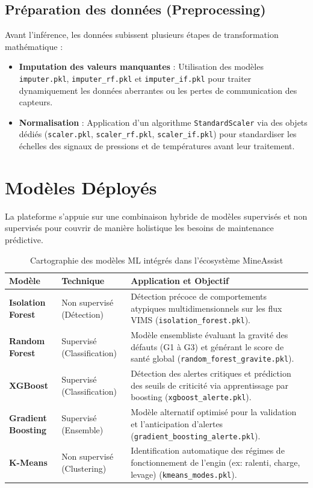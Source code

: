 \documentclass[12pt,a4paper]{report}
\begin{document}
\subsection{Préparation des données (Preprocessing)}
Avant l'inférence, les données subissent plusieurs étapes de transformation mathématique :
\begin{itemize}
  \item \textbf{Imputation des valeurs manquantes} : Utilisation des modèles \texttt{imputer.pkl}, \texttt{imputer\_rf.pkl} et \texttt{imputer\_if.pkl} pour traiter dynamiquement les données aberrantes ou les pertes de communication des capteurs.
  \item \textbf{Normalisation} : Application d'un algorithme \texttt{StandardScaler} via des objets dédiés (\texttt{scaler.pkl}, \texttt{scaler\_rf.pkl}, \texttt{scaler\_if.pkl}) pour standardiser les échelles des signaux de pressions et de températures avant leur traitement.
\end{itemize}

\section{Modèles Déployés}

La plateforme s'appuie sur une combinaison hybride de modèles supervisés et non supervisés pour couvrir de manière holistique les besoins de maintenance prédictive.

\begin{table}[H]
\centering
\begin{tabular}{>{\bfseries}p{3cm} p{4cm} p{7cm}}
\toprule
\textcolor{ocpGreen}{Modèle} & \textcolor{ocpGreen}{Technique} & \textcolor{ocpGreen}{Application et Objectif} \\
\midrule
Isolation Forest & Non supervisé (Détection) & Détection précoce de comportements atypiques multidimensionnels sur les flux VIMS (\texttt{isolation\_forest.pkl}). \\
\addlinespace
Random Forest & Supervisé (Classification) & Modèle ensembliste évaluant la gravité des défauts (G1 à G3) et générant le score de santé global (\texttt{random\_forest\_gravite.pkl}). \\
\addlinespace
XGBoost & Supervisé (Classification) & Détection des alertes critiques et prédiction des seuils de criticité via apprentissage par boosting (\texttt{xgboost\_alerte.pkl}). \\
\addlinespace
Gradient Boosting & Supervisé (Ensemble) & Modèle alternatif optimisé pour la validation et l'anticipation d'alertes (\texttt{gradient\_boosting\_alerte.pkl}). \\
\addlinespace
K-Means & Non supervisé (Clustering) & Identification automatique des régimes de fonctionnement de l'engin (ex: ralenti, charge, levage) (\texttt{kmeans\_modes.pkl}). \\
\bottomrule
\end{tabular}
\caption{Cartographie des modèles ML intégrés dans l'écosystème MineAssist}
\end{table}
\end{document}
